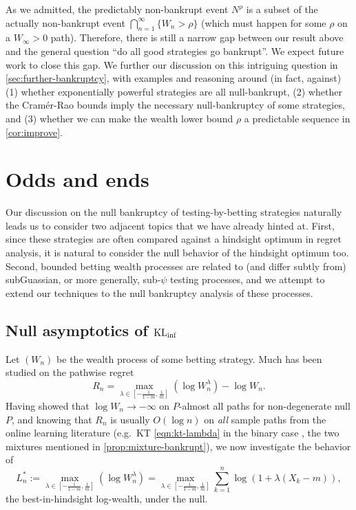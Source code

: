 As we admitted, the predictably non-bankrupt event $N^\rho$ is a subset of the actually non-bankrupt event $\bigcap_{n=1}^\infty \{ W_n > \rho \}$ (which must happen for some $\rho$ on a $W_\infty > 0$ path). Therefore, there is still a narrow gap between our result above and the general question ``do all good strategies go bankrupt''. We expect future work to close this gap.
We further our discussion on this intriguing question in \cref{sec:further-bankruptcy}, with examples and reasoning around (in fact, against) (1) whether exponentially powerful strategies are all null-bankrupt, (2) whether the Cram\'er-Rao bounds imply the necessary null-bankruptcy of some strategies, and (3) whether we can make the wealth lower bound $\rho$ a predictable sequence in \cref{cor:improve}.



\section{Odds and ends}

Our discussion on the null bankruptcy of testing-by-betting strategies naturally leads us to consider two adjacent topics that we have already hinted at. First, since these strategies are often compared against a hindsight optimum in regret analysis, it is natural to consider the null behavior of the hindsight optimum too. Second, bounded betting wealth processes are related to (and differ subtly from) subGuassian, or more generally, sub-$\psi$ testing processes, and we attempt to extend our techniques to the null bankruptcy analysis of these processes.

\subsection{Null asymptotics of $\operatorname{KL}_{\inf}$}\label{sec:klinf}

Let $(W_n)$ be the wealth process of some betting strategy.
Much has been studied on the pathwise regret
\begin{equation}
    R_n = \max_{\lambda \in [-\frac{1}{1-m}, \frac{1}{m}]} (\log W_n^\lambda) - \log W_n.
\end{equation}
Having showed that $\log W_n \to -\infty$ on $P$-almost all paths for non-degenerate null $P$, and knowing that $R_n$ is usually $O(\log n)$ on \emph{all} sample paths from the online learning literature (e.g.\ KT \eqref{eqn:kt-lambda} in the binary case \citep{orabona2016coin}, the two mixtures mentioned in \cref{prop:mixture-bankrupt}),
we now investigate the behavior of
\begin{equation}
   L_n^* :=\max_{\lambda \in [-\frac{1}{1-m}, \frac{1}{m}]} (\log W_n^\lambda) = \max_{\lambda \in [-\frac{1}{1-m}, \frac{1}{m}]} \sum_{k=1}^n \log(1+\lambda(X_k - m)),
\end{equation}
the best-in-hindsight log-wealth, under the null.

